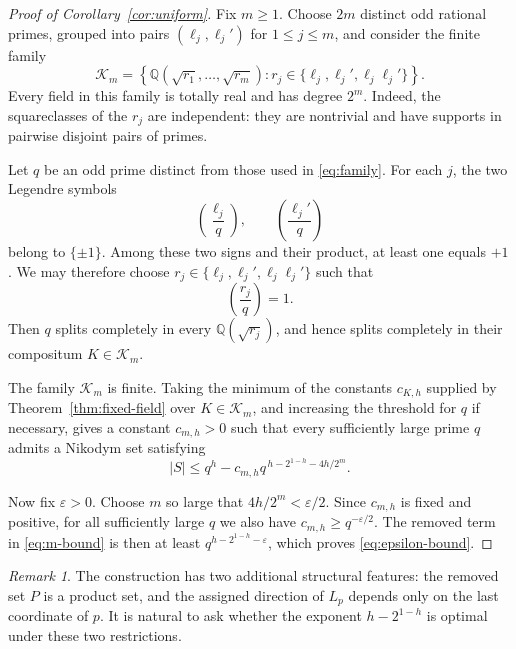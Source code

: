 \documentclass[11pt]{article}
\theoremstyle{plain}
\theoremstyle{remark}
\newtheorem{remark}[theorem]{Remark}
\newcommand{\Q}{\mathbb Q}
\begin{document}
\begin{proof}[Proof of Corollary~\ref{cor:uniform}]
Fix $m\geq1$.  Choose $2m$ distinct odd rational primes, grouped into pairs
$(\ell_j,\ell_j')$ for $1\leq j\leq m$, and consider the finite family
\begin{equation}\label{eq:family}
  \mathcal K_m=
  \left\{
  \Q(\sqrt{r_1},\ldots,\sqrt{r_m}):
  r_j\in\{\ell_j,\ell_j',\ell_j\ell_j'\}
  \right\}.
\end{equation}
Every field in this family is totally real and has degree $2^m$.  Indeed,
the squareclasses of the $r_j$ are independent: they are nontrivial and have
supports in pairwise disjoint pairs of primes.

Let $q$ be an odd prime distinct from those used in \eqref{eq:family}.  For
each $j$, the two Legendre symbols
\[
  \left(\frac{\ell_j}{q}\right),
  \qquad
  \left(\frac{\ell_j'}{q}\right)
\]
belong to $\{\pm1\}$.  Among these two signs and their product, at least one
equals $+1$.  We may therefore choose
$r_j\in\{\ell_j,\ell_j',\ell_j\ell_j'\}$ such that
\[
  \left(\frac{r_j}{q}\right)=1.
\]
Then $q$ splits completely in every $\Q(\sqrt{r_j})$, and hence splits
completely in their compositum $K\in\mathcal K_m$.

The family $\mathcal K_m$ is finite.  Taking the minimum of the constants
$c_{K,h}$ supplied by Theorem~\ref{thm:fixed-field} over
$K\in\mathcal K_m$, and increasing the threshold for $q$ if necessary, gives
a constant $c_{m,h}>0$ such that every sufficiently large prime $q$ admits a
Nikodym set satisfying
\begin{equation}\label{eq:m-bound}
  |S|\leq q^h-c_{m,h}
  q^{\,h-2^{1-h}-4h/2^m}.
\end{equation}

Now fix $\varepsilon>0$.  Choose $m$ so large that
$4h/2^m<\varepsilon/2$.  Since $c_{m,h}$ is fixed and positive, for all
sufficiently large $q$ we also have $c_{m,h}\geq q^{-\varepsilon/2}$.
The removed term in \eqref{eq:m-bound} is then at least
$q^{h-2^{1-h}-\varepsilon}$, which proves \eqref{eq:epsilon-bound}.
\end{proof}

\begin{remark}
The construction has two additional structural features: the removed set
$P$ is a product set, and the assigned direction of $L_p$ depends only on the
last coordinate of $p$.  It is natural to ask whether the exponent
$h-2^{1-h}$ is optimal under these two restrictions.
\end{remark}
\end{document}
